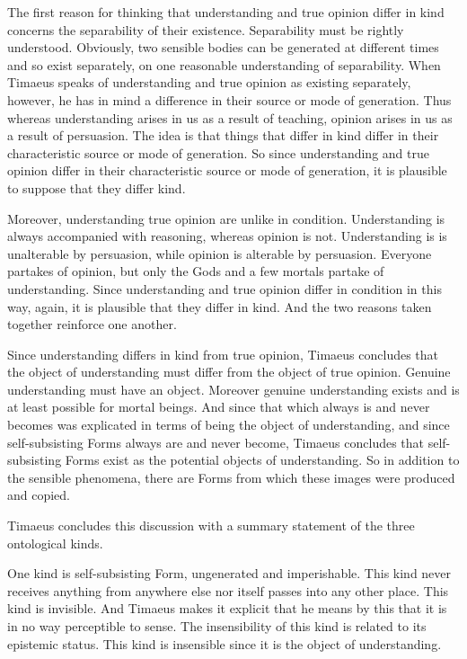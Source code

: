 The first reason for thinking that understanding and true opinion differ in kind concerns the separability of their existence. Separability must be rightly understood. Obviously, two sensible bodies can be generated at different times and so exist separately, on one reasonable understanding of separability. When Timaeus speaks of understanding and true opinion as existing separately, however, he has in mind a difference in their source or mode of generation. Thus whereas understanding arises in us as a result of teaching, opinion arises in us as a result of persuasion. The idea is that things that differ in kind differ in their characteristic source or mode of generation. So since understanding and true opinion differ in their characteristic source or mode of generation, it is plausible to suppose that they differ kind.

Moreover, understanding true opinion are unlike in condition. Understanding is always accompanied with reasoning, whereas opinion is not. Understanding is is unalterable by persuasion, while opinion is alterable by persuasion. Everyone partakes of opinion, but only the Gods and a few mortals partake of understanding. Since understanding and true opinion differ in condition in this way, again, it is plausible that they differ in kind. And the two reasons taken together reinforce one another.

Since understanding differs in kind from true opinion, Timaeus concludes that the object of understanding must differ from the object of true opinion. Genuine understanding must have an object. Moreover genuine understanding exists and is at least possible for mortal beings. And since that which always is and never becomes was explicated in terms of being the object of understanding, and since self-subsisting Forms always are and never become, Timaeus concludes that self-subsisting Forms exist as the potential objects of understanding. So in addition to the sensible phenomena, there are Forms from which these images were produced and copied.

Timaeus concludes this discussion with a summary statement of the three ontological kinds. 

One kind is self-subsisting Form, ungenerated and imperishable. This kind never receives anything from anywhere else nor itself passes into any other place. This kind is invisible. And Timaeus makes it explicit that he means by this that it is in no way perceptible to sense. The insensibility of this kind is related to its epistemic status. This kind is insensible since it is the object of understanding.

